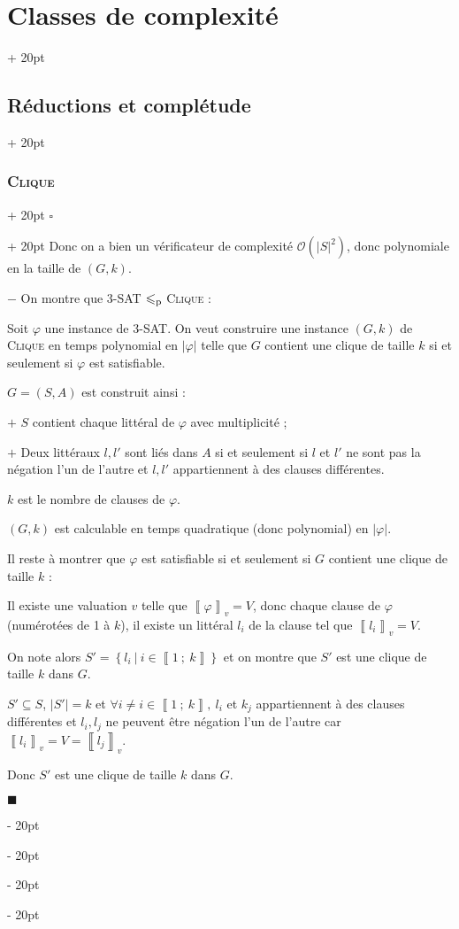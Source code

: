 \documentclass[a4paper, 12pt, twoside]{article}
\newcommand{\nset}[2]{\left\llbracket #1\ ;\ #2 \right\rrbracket}
\newcommand{\lr}[1]{\left( #1 \right)}
\newcommand{\lrbb}[1]{\left\llbracket #1 \right\rrbracket}
\newcommand{\set}[1]{\left\{ #1 \right\}}
\newcommand{\abs}[1]{\left\lvert #1 \right\rvert}
\renewcommand{\le}{\leqslant}
\newcommand{\ind}[1][20pt]{\advance\leftskip + #1}
\newcommand{\deind}[1][20pt]{\advance\leftskip - #1}
\newenvironment{indt}[2][20pt]{#2 \par \ind[#1]}{\par \deind} %
\newenvironment{proof}[1][{}]{\begin{indt}{$\square$ #1}}{$\blacksquare$ \end{indt}}
\begin{document}
\begin{indt}{\section{Classes de complexité}}
\begin{indt}{\subsection{Réductions et complétude}}
\begin{indt}{\subsubsection{\textsc{Clique}}}
\begin{proof}
                    Donc on a bien un vérificateur de complexité $\mathcal O\!\lr{\abs S ^2}$, donc polynomiale en la taille de $(G, k)$.

                    \vspace{6pt}
                    
                    $-$ On montre que $3$-SAT $\le_{\rm p}$ \textsc{Clique} :

                    Soit $\varphi$ une instance de 3-SAT. On veut construire une instance $(G, k)$ de \textsc{Clique} en temps polynomial en $\abs \varphi$ telle que $G$ contient une clique de taille $k$ si et seulement si $\varphi$ est satisfiable.

                    $G = (S, A)$ est construit ainsi :

                    $+$ $S$ contient chaque littéral de $\varphi$ avec multiplicité ;

                    $+$ Deux littéraux $l, l'$ sont liés dans $A$ si et seulement si $l$ et $l'$ ne sont pas la négation l'un de l'autre et $l, l'$ appartiennent à des clauses différentes.

                    $k$ est le nombre de clauses de $\varphi$.

                    $(G, k)$ est calculable en temps quadratique (donc polynomial) en $\abs \varphi$.

                    \vspace{6pt}
                    
                    Il reste à montrer que $\varphi$ est satisfiable si et seulement si $G$ contient une clique de taille $k$ :

                    \boxed{\Rightarrow} Il existe une valuation $v$ telle que $\lrbb \varphi _v = V$, donc chaque clause de $\varphi$ (numérotées de 1 à $k$), il existe un littéral $l_i$ de la clause tel que $\lrbb{l_i}_v = V$.

                    On note alors $S' = \set{l_i\ |\ i \in \nset 1 k}$ et on montre que $S'$ est une clique de taille $k$ dans $G$.

                    $S' \subseteq S$, $\abs{S'} = k$ et $\forall i \neq i \in \nset 1 k,\ l_i$ et $k_j$ appartiennent à des clauses différentes et $l_i, l_j$ ne peuvent être négation l'un de l'autre car  $\lrbb{l_i}_v = V = \lrbb{l_j}_v$.

                    Donc $S'$ est une clique de taille $k$ dans $G$.

                    \vspace{6pt}
                    

\end{proof}
\end{indt}
\end{indt}
\end{indt}
\end{document}
